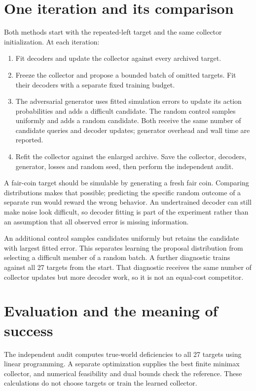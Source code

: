 \documentclass[11pt]{article}
\begin{document}
\section{One iteration and its comparison}
Both methods start with the repeated-left target and the same collector
initialization. At each iteration:
\begin{enumerate}
\item Fit decoders and update the collector against every archived target.
\item Freeze the collector and propose a bounded batch of omitted targets.
Fit their decoders with a separate fixed training budget.
\item The adversarial generator uses fitted simulation errors to update its
action probabilities and adds a difficult candidate. The random control samples
uniformly and adds a random candidate. Both receive the same number of candidate
queries and decoder updates; generator overhead and wall time are reported.
\item Refit the collector against the enlarged archive. Save the collector,
decoders, generator, losses and random seed, then perform the independent audit.
\end{enumerate}

A fair-coin target should be simulable by generating a fresh fair coin. Comparing
distributions makes that possible; predicting the specific random outcome of a
separate run would reward the wrong behavior. An undertrained decoder can still
make noise look difficult, so decoder fitting is part of the experiment rather
than an assumption that all observed error is missing information.

An additional control samples candidates uniformly but retains the candidate
with largest fitted error. This separates learning the proposal distribution
from selecting a difficult member of a random batch. A further diagnostic
trains against all 27 targets from the start. That diagnostic receives the same
number of collector updates but more decoder work, so it is not an equal-cost
competitor.

\section{Evaluation and the meaning of success}
The independent audit computes true-world deficiencies to all 27 targets using
linear programming. A separate optimization supplies the best finite minimax
collector, and numerical feasibility and dual bounds check the reference. These
calculations do not choose targets or train the learned collector.
\end{document}
